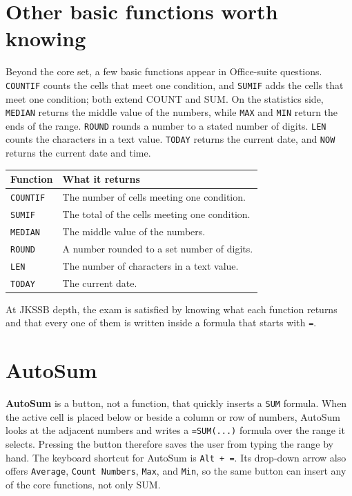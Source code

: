\documentclass[11pt]{article}
\begin{document}
\section{Other basic functions worth knowing}
Beyond the core set, a few basic functions appear in Office-suite questions.
\texttt{COUNTIF} counts the cells that meet one condition, and \texttt{SUMIF}
adds the cells that meet one condition; both extend COUNT and SUM. On the
statistics side, \texttt{MEDIAN} returns the middle value of the numbers,
while \texttt{MAX} and \texttt{MIN} return the ends of the range.
\texttt{ROUND} rounds a number to a stated number of digits. \texttt{LEN}
counts the characters in a text value. \texttt{TODAY} returns the current
date, and \texttt{NOW} returns the current date and time.

\begin{center}
\begin{tabular}{p{}p{}}
\toprule
\textbf{Function} & \textbf{What it returns} \\
\midrule
\texttt{COUNTIF} & The number of cells meeting one condition. \\
\texttt{SUMIF} & The total of the cells meeting one condition. \\
\texttt{MEDIAN} & The middle value of the numbers. \\
\texttt{ROUND} & A number rounded to a set number of digits. \\
\texttt{LEN} & The number of characters in a text value. \\
\texttt{TODAY} & The current date. \\
\bottomrule
\end{tabular}
\end{center}

At JKSSB depth, the exam is satisfied by knowing what each function returns
and that every one of them is written inside a formula that starts with
\texttt{=}.

\section{AutoSum}
\textbf{AutoSum} is a button, not a function, that quickly inserts a
\texttt{SUM} formula. When the active cell is placed below or beside a column
or row of numbers, AutoSum looks at the adjacent numbers and writes a
\texttt{=SUM(...)} formula over the range it selects. Pressing the button
therefore saves the user from typing the range by hand. The keyboard shortcut
for AutoSum is \texttt{Alt + =}. Its drop-down arrow also offers
\texttt{Average}, \texttt{Count Numbers}, \texttt{Max}, and \texttt{Min}, so
the same button can insert any of the core functions, not only SUM.
\end{document}
